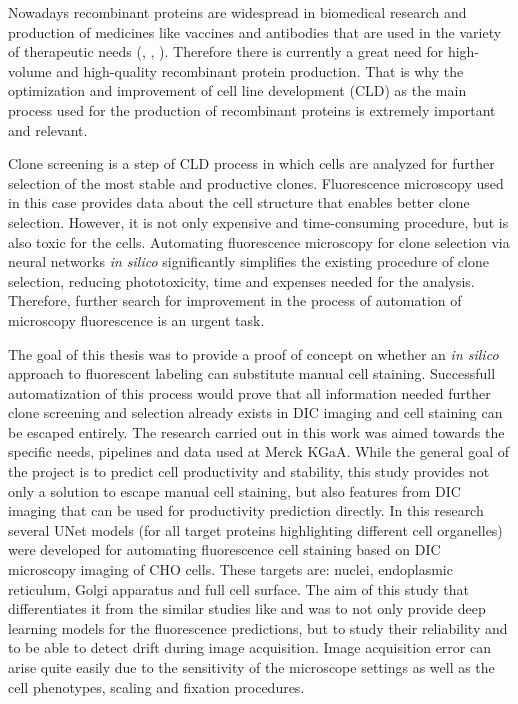 Nowadays recombinant proteins are widespread in biomedical research and production of medicines like vaccines and antibodies that are used in the variety of therapeutic needs (\cite{Liu_2022}, \cite{Kim_2011}, \cite{Jayapal_2007}). Therefore there is currently a great need for high-volume and high-quality recombinant protein production. That is why the optimization and improvement of cell line development (CLD) as the main process used for the production of recombinant proteins is extremely important and relevant.

Clone screening is a step of CLD process in which cells are analyzed for further selection of the most stable and productive clones. Fluorescence microscopy used in this case provides data about the cell structure that enables better clone selection. However, it is not only expensive and time-consuming procedure, but is also toxic for the cells. Automating fluorescence microscopy for clone selection via neural networks \textit{in silico} significantly simplifies the existing procedure of clone selection, reducing phototoxicity, time and expenses needed for the analysis. Therefore, further search for improvement in the process of automation of microscopy fluorescence is an urgent task.

The goal of this thesis was to provide a proof of concept on whether an \textit{in silico} approach to fluorescent labeling can substitute manual cell staining. Successfull automatization of this process would prove that all information needed further clone screening and selection already exists in DIC imaging and cell staining can be escaped entirely. The research carried out in this work was aimed towards the specific needs, pipelines and data used at Merck KGaA. While the general goal of the project is to predict cell productivity and stability, this study provides not only a solution to escape manual cell staining, but also features from DIC imaging that can be used for productivity prediction directly. In this research several UNet models (for all target proteins highlighting different cell organelles) were developed for automating fluorescence cell staining based on DIC microscopy imaging of CHO cells. These targets are: nuclei, endoplasmic reticulum, Golgi apparatus and full cell surface. The aim of this study that differentiates it from the similar studies like \cite{Lachance_2020} and \cite{Christiansen_2018} was to not only provide deep learning models for the fluorescence predictions, but to study their reliability and to be able to detect drift during image acquisition. Image acquisition error can arise quite easily due to the sensitivity of the microscope settings as well as the cell phenotypes, scaling and fixation procedures.

